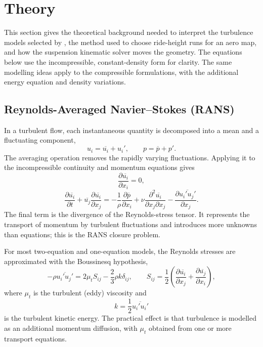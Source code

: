 \section{Theory}

This section gives the theoretical background needed to interpret the turbulence models selected by , the method used to choose ride-height runs for an aero map, and how the suspension kinematic solver moves the geometry. The equations below use the incompressible, constant-density form for clarity. The same modelling ideas apply to the compressible formulations, with the additional energy equation and density variations.

\subsection{Reynolds-Averaged Navier--Stokes (RANS)}

In a turbulent flow, each instantaneous quantity is decomposed into a mean and a fluctuating component,
\begin{equation}
    u_i = \overline{u_i} + u_i', \qquad p = \overline{p} + p'.
\end{equation}
The averaging operation removes the rapidly varying fluctuations. Applying it to the incompressible continuity and momentum equations gives
\begin{equation}
    \frac{\partial \overline{u_i}}{\partial x_i} = 0,
\end{equation}
\begin{equation}
    \frac{\partial \overline{u_i}}{\partial t}
    + \overline{u_j}\frac{\partial \overline{u_i}}{\partial x_j}
    = -\frac{1}{\rho}\frac{\partial \overline{p}}{\partial x_i}
    + \nu\frac{\partial^2 \overline{u_i}}{\partial x_j\partial x_j}
    - \frac{\partial \overline{u_i' u_j'}}{\partial x_j}.
\end{equation}
The final term is the divergence of the Reynolds-stress tensor. It represents the transport of momentum by turbulent fluctuations and introduces more unknowns than equations; this is the RANS closure problem.

For most two-equation and one-equation models, the Reynolds stresses are approximated with the Boussinesq hypothesis,
\begin{equation}
    -\rho\overline{u_i'u_j'}
    = 2\mu_t S_{ij} - \frac{2}{3}\rho k\delta_{ij},
    \qquad
    S_{ij}=\frac{1}{2}\left(\frac{\partial \overline{u_i}}{\partial x_j}
    +\frac{\partial \overline{u_j}}{\partial x_i}\right),
\end{equation}
where $\mu_t$ is the turbulent (eddy) viscosity and
\begin{equation}
    k=\frac{1}{2}\overline{u_i'u_i'}
\end{equation}
is the turbulent kinetic energy. The practical effect is that turbulence is modelled as an additional momentum diffusion, with $\mu_t$ obtained from one or more transport equations.

